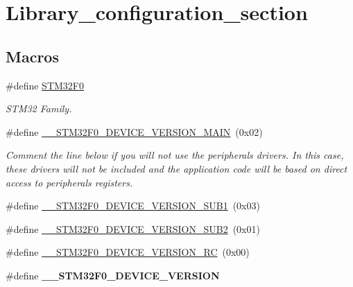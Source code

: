 \hypertarget{group___library__configuration__section}{}\section{Library\+\_\+configuration\+\_\+section}
\label{group___library__configuration__section}
\subsection*{Macros}
\begin{DoxyCompactItemize}
\item 
\mbox{\label{group___library__configuration__section_ga5ff454728a9a164b5469717c044546f4}} 
\#define \hyperlink{group___library__configuration__section_ga5ff454728a9a164b5469717c044546f4}{S\+T\+M32\+F0}
\begin{DoxyCompactList}\small\item\em S\+T\+M32 Family. \end{DoxyCompactList}\item 
\#define \hyperlink{group___library__configuration__section_ga66dd4a5456033130cc762ae237487dbb}{\+\_\+\+\_\+\+S\+T\+M32\+F0\+\_\+\+D\+E\+V\+I\+C\+E\+\_\+\+V\+E\+R\+S\+I\+O\+N\+\_\+\+M\+A\+IN}~(0x02)
\begin{DoxyCompactList}\small\item\em Comment the line below if you will not use the peripherals drivers. In this case, these drivers will not be included and the application code will be based on direct access to peripherals registers. \end{DoxyCompactList}\item 
\#define \hyperlink{group___library__configuration__section_ga27cda80c27dab2457fbd235e998db878}{\+\_\+\+\_\+\+S\+T\+M32\+F0\+\_\+\+D\+E\+V\+I\+C\+E\+\_\+\+V\+E\+R\+S\+I\+O\+N\+\_\+\+S\+U\+B1}~(0x03)
\item 
\#define \hyperlink{group___library__configuration__section_gae421b39741c9fd5aa0f7d4ccf6b6b253}{\+\_\+\+\_\+\+S\+T\+M32\+F0\+\_\+\+D\+E\+V\+I\+C\+E\+\_\+\+V\+E\+R\+S\+I\+O\+N\+\_\+\+S\+U\+B2}~(0x01)
\item 
\#define \hyperlink{group___library__configuration__section_ga745d01d9751b23c2157e1a6710d75235}{\+\_\+\+\_\+\+S\+T\+M32\+F0\+\_\+\+D\+E\+V\+I\+C\+E\+\_\+\+V\+E\+R\+S\+I\+O\+N\+\_\+\+RC}~(0x00)
\item 
\#define {\bfseries \+\_\+\+\_\+\+S\+T\+M32\+F0\+\_\+\+D\+E\+V\+I\+C\+E\+\_\+\+V\+E\+R\+S\+I\+ON}
\end{DoxyCompactItemize}


